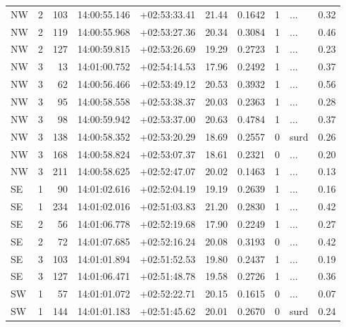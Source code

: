 \begin{tabular}{lrrllrrrlr}
  NW &       2 &    103 &  14:00:55.146 &  +02:53:33.41 &  21.44 &    0.1642 &  1 &        ... &        0.32 \\
  NW &       2 &    119 &  14:00:55.968 &  +02:53:27.36 &  20.34 &    0.3084 &  1 &        ... &        0.46 \\
  NW &       2 &    127 &  14:00:59.815 &  +02:53:26.69 &  19.29 &    0.2723 &  1 &        ... &        0.23 \\
  NW &       3 &     13 &  14:01:00.752 &  +02:54:14.53 &  17.96 &    0.2492 &  1 &        ... &        0.37 \\
  NW &       3 &     62 &  14:00:56.466 &  +02:53:49.12 &  20.53 &    0.3932 &  1 &        ... &        0.56 \\
  NW &       3 &     95 &  14:00:58.558 &  +02:53:38.37 &  20.03 &    0.2363 &  1 &        ... &        0.28 \\
  NW &       3 &     98 &  14:00:59.942 &  +02:53:37.00 &  20.63 &    0.4784 &  1 &        ... &        0.37 \\
  NW &       3 &    138 &  14:00:58.352 &  +02:53:20.29 &  18.69 &    0.2557 &  0 &       surd &        0.26 \\
  NW &       3 &    168 &  14:00:58.824 &  +02:53:07.37 &  18.61 &    0.2321 &  0 &        ... &        0.20 \\
  NW &       3 &    211 &  14:00:58.625 &  +02:52:47.07 &  20.02 &    0.1463 &  1 &        ... &        0.13 \\
  SE &       1 &     90 &  14:01:02.616 &  +02:52:04.19 &  19.19 &    0.2639 &  1 &        ... &        0.16 \\
  SE &       1 &    234 &  14:01:02.016 &  +02:51:03.83 &  21.20 &    0.2830 &  1 &        ... &        0.42 \\
  SE &       2 &     56 &  14:01:06.778 &  +02:52:19.68 &  17.90 &    0.2249 &  1 &        ... &        0.27 \\
  SE &       2 &     72 &  14:01:07.685 &  +02:52:16.24 &  20.08 &    0.3193 &  0 &        ... &        0.42 \\
  SE &       3 &    103 &  14:01:01.894 &  +02:51:52.53 &  19.80 &    0.2437 &  1 &        ... &        0.19 \\
  SE &       3 &    127 &  14:01:06.471 &  +02:51:48.78 &  19.58 &    0.2726 &  1 &        ... &        0.36 \\
  SW &       1 &     57 &  14:01:01.072 &  +02:52:22.71 &  20.15 &    0.1615 &  0 &        ... &        0.07 \\
  SW &       1 &    144 &  14:01:01.183 &  +02:51:45.62 &  20.01 &    0.2670 &  0 &       surd &        0.24 \\

\end{tabular}
